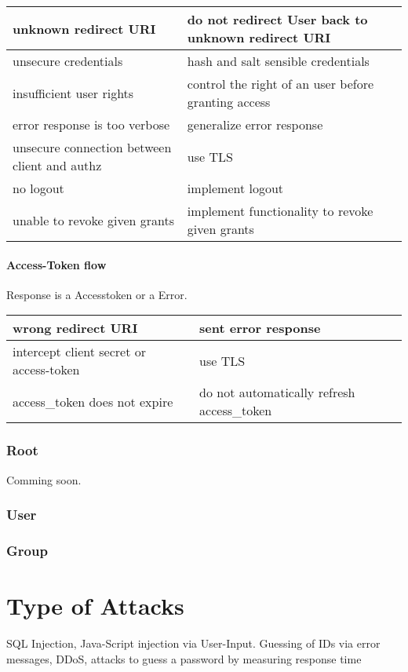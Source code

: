 \begin{tabular}{|l|l|}
    \hline
    unknown redirect URI & do not redirect User back to unknown redirect URI\\
    \hline
    unsecure credentials & hash and salt sensible credentials \\
    \hline
    insufficient user rights & control the right of an user before granting access \\
    \hline
    error response is too verbose & generalize error response \\
    \hline
    unsecure connection between client and authz & use TLS \\
    \hline
    no logout & implement logout \\
    \hline
    unable to revoke given grants & implement functionality to revoke given grants \\
    \hline
 \end{tabular}

\paragraph{Access-Token flow}

Response is a Accesstoken or a Error.

\begin{tabular}{|l|l|}
    \hline
    wrong redirect URI & sent error response\\
    \hline
    intercept client secret or access-token & use TLS \\
    \hline
    access_token does not expire & do not automatically refresh access_token \\
    \hline
 \end{tabular}



\subsubsection{Root}
Comming soon.

\subsubsection{User}

\subsubsection{Group}

\section{Type of Attacks}
SQL Injection, Java-Script injection via User-Input.
Guessing of IDs via error messages, DDoS, 
attacks to guess a password by measuring response time
